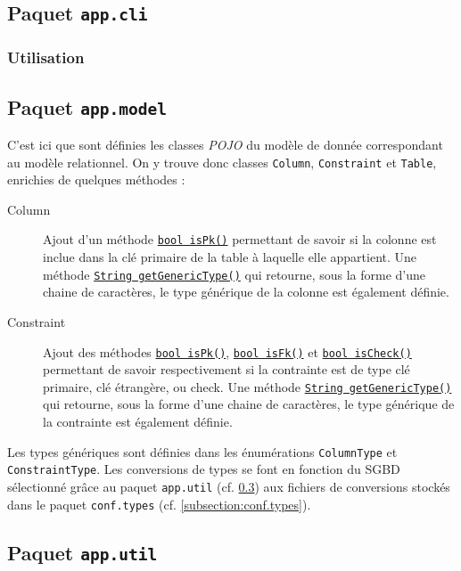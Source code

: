 \subsection{Paquet \texttt{app.cli}}
\subsubsection{Utilisation}

\subsection{Paquet \texttt{app.model}}
C'est ici que sont définies les classes \emph{POJO} du modèle de donnée correspondant au modèle relationnel. On y trouve donc classes \texttt{Column}, \texttt{Constraint} et \texttt{Table}, enrichies de quelques méthodes :

\begin{description}

\item[Column] Ajout d'un méthode \texttt{\underline{bool isPk()}} permettant de savoir si la colonne est inclue dans la clé primaire de la table à laquelle elle appartient. Une méthode \texttt{\underline{String getGenericType()}} qui retourne, sous la forme d'une chaine de caractères, le type générique de la colonne est également définie.

\item[Constraint] Ajout des méthodes \texttt{\underline{bool isPk()}}, \texttt{\underline{bool isFk()}} et \texttt{\underline{bool isCheck()}} permettant de savoir respectivement si la contrainte est de type clé primaire, clé étrangère, ou check. Une méthode \texttt{\underline{String getGenericType()}} qui retourne, sous la forme d'une chaine de caractères, le type générique de la contrainte est également définie.
\end{description}

Les types génériques sont définies dans les énumérations \texttt{ColumnType} et \texttt{ConstraintType}. Les conversions de types se font en fonction du SGBD sélectionné grâce au paquet \texttt{app.util} (cf. \ref{subsection:app.util}) aux fichiers de conversions stockés dans le paquet \texttt{conf.types} (cf. \ref{subsection:conf.types}).

\subsection{Paquet \texttt{app.util}}
\label{subsection:app.util}

